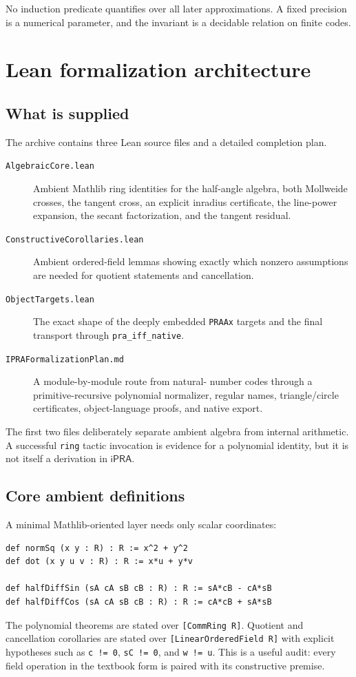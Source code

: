 \documentclass[11pt,letterpaper]{article}
\theoremstyle{definition}
\theoremstyle{remark}
\newcommand{\ipra}{\mathsf{iPRA}}
\newcommand{\code}[1]{\texttt{#1}}
\begin{document}
No induction predicate quantifies over all later approximations.  A fixed
precision is a numerical parameter, and the invariant is a decidable relation
on finite codes.

\section{Lean formalization architecture}
\label{sec:lean}

\subsection{What is supplied}

The archive contains three Lean source files and a detailed completion plan.

\begin{description}
\item[\code{AlgebraicCore.lean}] Ambient Mathlib ring identities for the
half-angle algebra, both Mollweide crosses, the tangent cross, an explicit
inradius certificate, the line-power expansion, the secant factorization, and
the tangent residual.
\item[\code{ConstructiveCorollaries.lean}] Ambient ordered-field lemmas showing
exactly which nonzero assumptions are needed for quotient statements and
cancellation.
\item[\code{ObjectTargets.lean}] The exact shape of the deeply embedded
\texttt{PRAAx} targets and the final transport through
\texttt{pra\_iff\_native}.
\item[\code{IPRAFormalizationPlan.md}] A module-by-module route from natural-
number codes through a primitive-recursive polynomial normalizer, regular
names, triangle/circle certificates, object-language proofs, and native export.
\end{description}

The first two files deliberately separate ambient algebra from internal
arithmetic.  A successful \texttt{ring} tactic invocation is evidence for a
polynomial identity, but it is not itself a derivation in \(\ipra\).

\subsection{Core ambient definitions}

A minimal Mathlib-oriented layer needs only scalar coordinates:
\begin{lstlisting}[language={}]
def normSq (x y : R) : R := x^2 + y^2
def dot (x y u v : R) : R := x*u + y*v

def halfDiffSin (sA cA sB cB : R) : R := sA*cB - cA*sB
def halfDiffCos (sA cA sB cB : R) : R := cA*cB + sA*sB
\end{lstlisting}
The polynomial theorems are stated over \code{[CommRing R]}.  Quotient and
cancellation corollaries are stated over \code{[LinearOrderedField R]} with
explicit hypotheses such as \code{c != 0}, \code{sC != 0}, and
\code{w != u}.  This is a useful audit: every field operation in the textbook
form is paired with its constructive premise.
\end{document}
